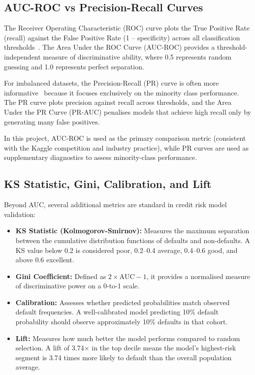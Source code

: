 \subsection{AUC-ROC vs Precision-Recall Curves}

The Receiver Operating Characteristic (ROC) curve plots the True Positive Rate (recall) against the False Positive Rate (1 -- specificity) across all classification thresholds~\cite{fawcett2006}. The Area Under the ROC Curve (AUC-ROC) provides a threshold-independent measure of discriminative ability, where 0.5 represents random guessing and 1.0 represents perfect separation.

For imbalanced datasets, the Precision-Recall (PR) curve is often more informative~\cite{saito2015} because it focuses exclusively on the minority class performance. The PR curve plots precision against recall across thresholds, and the Area Under the PR Curve (PR-AUC) penalises models that achieve high recall only by generating many false positives.

In this project, AUC-ROC is used as the primary comparison metric (consistent with the Kaggle competition and industry practice), while PR curves are used as supplementary diagnostics to assess minority-class performance.



\subsection{KS Statistic, Gini, Calibration, and Lift}

Beyond AUC, several additional metrics are standard in credit risk model validation:

\begin{itemize}
    \item \textbf{KS Statistic (Kolmogorov-Smirnov):} Measures the maximum separation between the cumulative distribution functions of defaults and non-defaults. A KS value below 0.2 is considered poor, 0.2--0.4 average, 0.4--0.6 good, and above 0.6 excellent.
    \item \textbf{Gini Coefficient:} Defined as $2 \times \text{AUC} - 1$, it provides a normalised measure of discriminative power on a 0-to-1 scale.
    \item \textbf{Calibration:} Assesses whether predicted probabilities match observed default frequencies. A well-calibrated model predicting 10\% default probability should observe approximately 10\% defaults in that cohort.
    \item \textbf{Lift:} Measures how much better the model performs compared to random selection. A lift of 3.74$\times$ in the top decile means the model's highest-risk segment is 3.74 times more likely to default than the overall population average.
\end{itemize}

